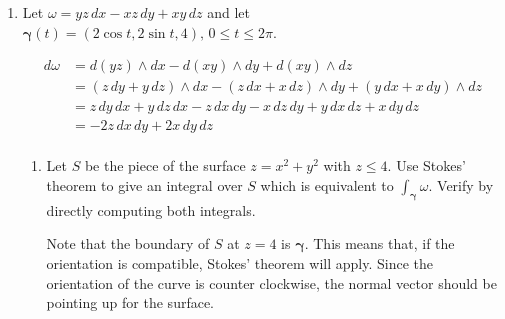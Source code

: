 \documentclass{article}
\begin{document}
\begin{enumerate}
    \newpage
    \item Let $\omega = yz\, dx - xz \, dy + xy \, dz$ and 
    let $\boldsymbol \gamma(t) = (2\cos t, 2\sin t, 4),\, 0 \leq t \leq 2\pi$.

        \begin{align*}
            d\omega &= d(yz) \wedge dx - d(xy) \wedge dy + d(xy) \wedge dz \\
            &= (z \,dy + y\, dz)\wedge dx - (z \, dx + x \, dz) \wedge dy + 
            (y \, dx + x \, dy) \wedge dz \\
            &= z \,dy \, dx + y\, dz \, dx - z \, dx \, dy - x \, dz \, dy + 
            y \, dx \, dz + x \, dy \, dz \\
            &= -2z \,dx \, dy  + 2x \, dy \, dz \\
        \end{align*} 
    \begin{enumerate}
        \item Let $S$ be the piece of the surface $z = x^2 + y^2$ with 
            $z \leq 4$. Use Stokes' theorem to give an integral over $S$ 
            which is equivalent to $\displaystyle \int_{\boldsymbol \gamma} 
            \omega$. Verify by directly computing both integrals.

            Note that the boundary of $S$ at $z = 4$ is $\boldsymbol \gamma$.
            This means that, if the orientation is compatible, Stokes' theorem 
            will apply. Since the orientation of the curve is counter 
            clockwise, the normal vector should be pointing up for the surface.
            

\end{enumerate}
\end{enumerate}
\end{document}
